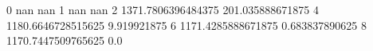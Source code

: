 0 nan nan
1 nan nan
2 1371.7806396484375 201.035888671875
4 1180.6646728515625 9.919921875
6 1171.4285888671875 0.683837890625
8 1170.7447509765625 0.0
